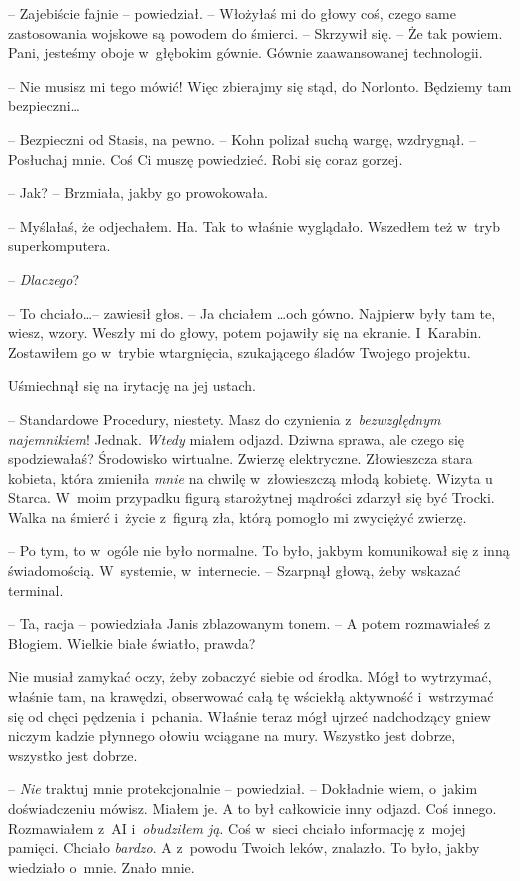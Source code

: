 \documentclass[oneside,polish,11pt,sfheadings]{mwbk}
\begin{document}
-- Zajebiście fajnie -- powiedział. -- Włożyłaś mi do głowy coś, czego same
zastosowania wojskowe są powodem do śmierci. -- Skrzywił się. -- Że tak
powiem. Pani, jesteśmy oboje w~głębokim gównie. Gównie zaawansowanej
technologii.

-- Nie musisz mi tego mówić! Więc zbierajmy się stąd, do Norlonto.
Będziemy tam bezpieczni\ldots

-- Bezpieczni od Stasis, na pewno. -- Kohn polizał suchą wargę, wzdrygnął.
-- Posłuchaj mnie. Coś Ci muszę powiedzieć. Robi się coraz gorzej.

-- Jak? -- Brzmiała, jakby go prowokowała.

-- Myślałaś, że odjechałem. Ha. Tak to właśnie wyglądało. Wszedłem też w~tryb superkomputera.

-- \emph{Dlaczego}?

-- To chciało\ldots -- zawiesił głos. -- Ja chciałem \ldots och gówno. Najpierw
były tam te, wiesz, wzory. Weszły mi do głowy, potem pojawiły się na
ekranie. I~Karabin. Zostawiłem go w~trybie wtargnięcia, szukającego
śladów Twojego projektu.

Uśmiechnął się na irytację na jej ustach.

-- Standardowe Procedury, niestety. Masz do czynienia z~\emph{bezwzględnym najemnikiem}! Jednak. \emph{Wtedy} miałem odjazd.
Dziwna sprawa, ale czego się spodziewałaś? Środowisko wirtualne. Zwierzę
elektryczne. Złowieszcza stara kobieta, która zmieniła \emph{mnie} na
chwilę w~złowieszczą młodą kobietę. Wizyta u Starca. W~moim przypadku
figurą starożytnej mądrości zdarzył się być Trocki. Walka na śmierć i~życie z~figurą zła, którą pomogło mi zwyciężyć zwierzę.

-- Po tym, to w~ogóle nie było normalne. To było, jakbym komunikował się
z inną świadomością. W~systemie, w~internecie. -- Szarpnął głową, żeby
wskazać terminal.

-- Ta, racja -- powiedziała Janis zblazowanym tonem. -- A potem rozmawiałeś
z Błogiem. Wielkie białe światło, prawda?

Nie musiał zamykać oczy, żeby zobaczyć siebie od środka. Mógł to
wytrzymać, właśnie tam, na krawędzi, obserwować całą tę wściekłą
aktywność i~wstrzymać się od chęci pędzenia i~pchania. Właśnie teraz
mógł ujrzeć nadchodzący gniew niczym kadzie płynnego ołowiu wciągane na
mury. Wszystko jest dobrze, wszystko jest dobrze.

-- \emph{Nie} traktuj mnie protekcjonalnie -- powiedział. -- Dokładnie
wiem, o~jakim doświadczeniu mówisz. Miałem je. A to był całkowicie inny
odjazd. Coś innego. Rozmawiałem z~AI i~\emph{obudziłem ją}. Coś w~sieci
chciało informację z~mojej pamięci. Chciało \emph{bardzo}. A z~powodu
Twoich leków, znalazło. To było, jakby wiedziało o~mnie. Znało mnie.
\end{document}
